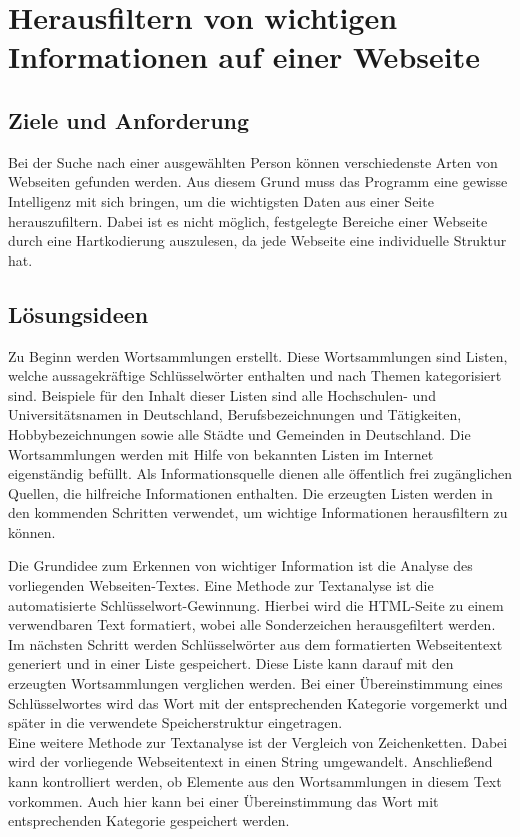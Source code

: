 \section{Herausfiltern von wichtigen Informationen auf einer Webseite}
	\subsection{Ziele und Anforderung}
	Bei der Suche nach einer ausgewählten Person können verschiedenste Arten von Webseiten gefunden werden. Aus diesem Grund muss das Programm eine gewisse Intelligenz mit sich bringen, um die wichtigsten Daten aus einer Seite herauszufiltern. Dabei ist es nicht möglich, festgelegte Bereiche einer Webseite durch eine Hartkodierung auszulesen, da jede Webseite eine individuelle Struktur hat.
	\subsection{Lösungsideen}
	\label{subsec:ErkennenVonInformation}	
	Zu Beginn werden Wortsammlungen erstellt. Diese Wortsammlungen sind Listen, welche aussagekräftige Schlüsselwörter enthalten und nach Themen kategorisiert sind. Beispiele für den Inhalt dieser Listen sind alle Hochschulen- und Universitätsnamen in Deutschland, Berufsbezeichnungen und Tätigkeiten, Hobbybezeichnungen sowie alle Städte und Gemeinden in Deutschland. Die Wortsammlungen werden mit Hilfe von bekannten Listen im Internet eigenständig befüllt. Als Informationsquelle dienen alle öffentlich frei zugänglichen Quellen, die hilfreiche Informationen enthalten. Die erzeugten Listen werden in den kommenden Schritten verwendet, um wichtige Informationen herausfiltern zu können.
	
	Die Grundidee zum Erkennen von wichtiger Information ist die Analyse des vorliegenden Webseiten-Textes. Eine Methode zur Textanalyse ist die automatisierte Schlüsselwort-Gewinnung. Hierbei wird die HTML-Seite zu einem verwendbaren Text formatiert, wobei alle Sonderzeichen herausgefiltert werden. Im nächsten Schritt werden Schlüsselwörter aus dem formatierten Webseitentext generiert und in einer Liste gespeichert. Diese Liste kann darauf mit den erzeugten Wortsammlungen verglichen werden. Bei einer Übereinstimmung eines Schlüsselwortes wird das Wort mit der entsprechenden Kategorie vorgemerkt und später in die verwendete Speicherstruktur eingetragen.\\
	Eine weitere Methode zur Textanalyse ist der Vergleich von Zeichenketten. Dabei wird der vorliegende Webseitentext in einen String umgewandelt. Anschließend kann kontrolliert werden, ob Elemente aus den Wortsammlungen in diesem Text vorkommen. Auch hier kann bei einer Übereinstimmung das Wort mit entsprechenden Kategorie gespeichert werden.
	
